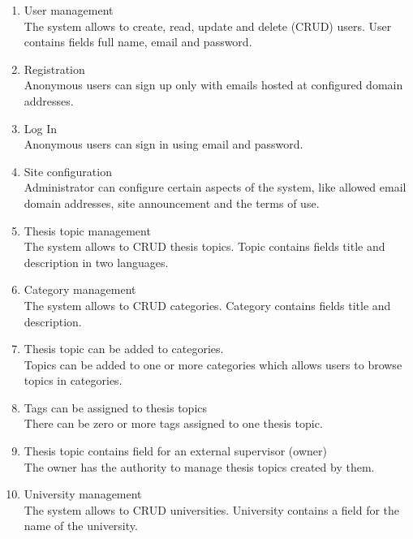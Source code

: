 \begin{enumerate}
    \item User management\\
    The system allows to create, read, update and delete (CRUD) users. User contains fields full name, email and password.

    \item Registration\\
    Anonymous users can sign up only with emails hosted at configured domain addresses.

    \item Log In\\
    Anonymous users can sign in using email and password.

    \item Site configuration\\
    Administrator can configure certain aspects of the system, like allowed email domain addresses, site announcement and the terms of use.

    \item Thesis topic management\\
    The system allows to CRUD thesis topics. Topic contains fields title and description in two languages.

    \item Category management\\
    The system allows to CRUD categories. Category contains fields title and description.

    \item Thesis topic can be added to categories.\\
    Topics can be added to one or more categories which allows users to browse topics in categories.

    \item Tags can be assigned to thesis topics\\
    There can be zero or more tags assigned to one thesis topic.

    \item Thesis topic contains field for an external supervisor (owner)\\
    The owner has the authority to manage thesis topics created by them.

    \item University management\\
    The system allows to CRUD universities. University contains a field for the name of the university.


\end{enumerate}
